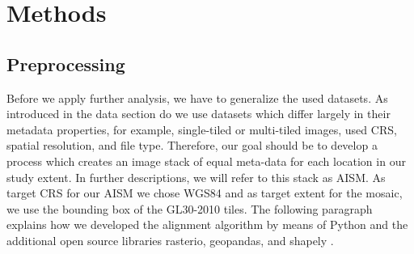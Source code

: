 \section{Methods}
\label{sec:methods}
	\subsection{Preprocessing}
		Before we apply further analysis, we have to generalize the used datasets. As introduced in the data section do we use datasets which differ largely in their metadata properties, for example, single-tiled or multi-tiled images, used \ac{CRS}, spatial resolution, and file type. Therefore, our goal should be to develop a process which creates an image stack of equal meta-data for each location in our study extent. In further descriptions, we will refer to this stack as \ac{AISM}. As target \ac{CRS} for our \ac{AISM} we chose \ac{WGS84} and as target extent for the mosaic, we use the bounding box of the \ac{GL30}-2010 tiles. The following paragraph explains how we developed the alignment algorithm by means of Python and the additional open source libraries rasterio, geopandas, and shapely \citep{Rossum2018,McKinney2010}.

